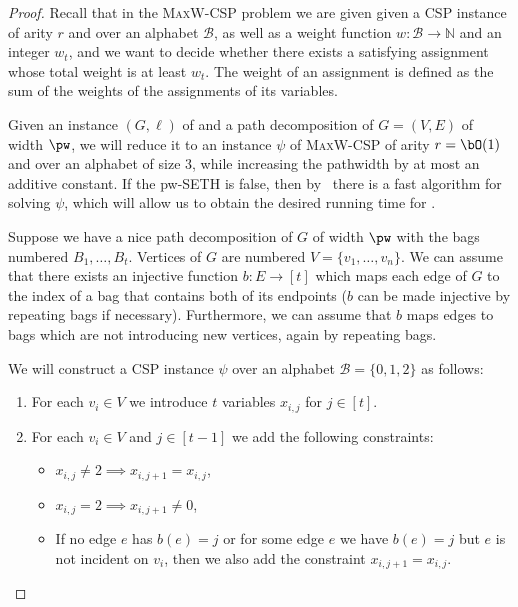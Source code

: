 \begin{proof}
    Recall that in the \textsc{MaxW-CSP} problem we are given given a
    \textsc{CSP} instance of arity $r$ and over an alphabet $\mathcal{B}$,
    as well as a weight function $w \colon \mathcal{B} \to \mathbb{N}$ and an integer $w_t$,
    and we want to decide whether there exists a satisfying assignment
    whose total weight is at least $w_t$.
    The weight of an assignment is defined as the sum of the weights
    of the assignments of its variables.

    Given an instance $(G,\ell)$ of {\InducedM} and a path decomposition of $G=(V,E)$ of width $\pw$,
    we will reduce it to an instance $\psi$ of \textsc{MaxW-CSP} of arity $r = \bO(1)$ and over an alphabet of size $3$,
    while increasing the pathwidth by at most an additive constant.
    If the pw-SETH is false, then by~\cite[Theorem~3.2]{soda/Lampis25} there is a fast algorithm for solving
    $\psi$, which will allow us to obtain the desired running time for \InducedM.

    Suppose we have a nice path decomposition of $G$ of width $\pw$ with the bags numbered
    $B_1, \ldots, B_t$.
    Vertices of $G$ are numbered $V = \{v_1, \ldots, v_n\}$.
    We can assume that there exists an injective function $b \colon E \to [t]$
    which maps each edge of $G$ to the index of a bag that contains both of its endpoints
    ($b$ can be made injective by repeating bags if necessary).
    Furthermore, we can assume that $b$ maps edges to bags which are not introducing new vertices,
    again by repeating bags.

    We will construct a CSP instance $\psi$ over an alphabet $\mathcal{B} = \{0,1,2\}$ as follows:
    \begin{enumerate}
        \item For each $v_i \in V$ we introduce $t$ variables $x_{i,j}$ for $j \in [t]$.

        \item For each $v_i \in V$ and $j \in [t-1]$ we add the following constraints:
        \begin{itemize}
            \item $x_{i,j} \neq 2 \implies x_{i,j+1} = x_{i,j}$,
            \item $x_{i,j} = 2 \implies x_{i,j+1} \neq 0$,
            \item If no edge $e$ has $b(e) = j$ or for some edge $e$ we have
                    $b(e) = j$ but $e$ is not incident on $v_i$,
                    then we also add the constraint $x_{i,j+1}=x_{i,j}$.
        \end{itemize}


\end{enumerate}
\end{proof}
